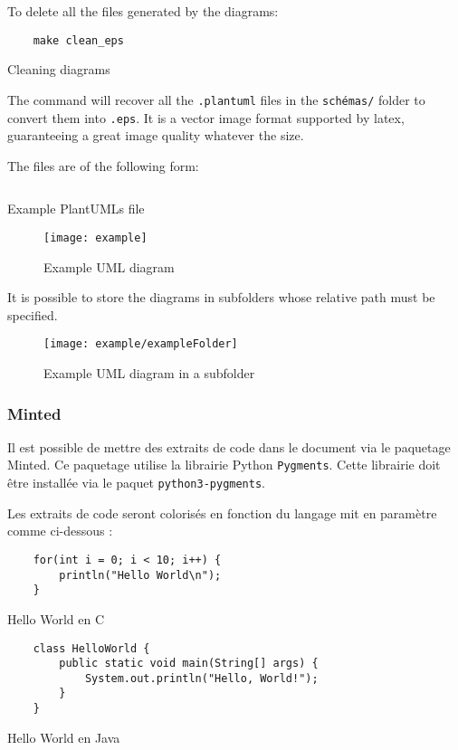 To delete all the files generated by the diagrams:
\begin{code}
    \begin{verbatim}
    make clean_eps
\end{verbatim}
    \caption{Cleaning diagrams}
\end{code}

The command will recover all the \verb=.plantuml= files
in the \verb=schémas/= folder to convert them into \verb=.eps=.
It is a vector image format supported by \gls{latex},
guaranteeing a great image quality whatever the size.

The files are of the following form:
\begin{code}
    \inputminted{vim}{../schemas/example.plantuml}
    \caption{Example PlantUMLs file}
\end{code}

\begin{figure}[H]
    \centering
    \texttt{[image: example]}
    \caption{Example UML diagram}
\end{figure}

It is possible to store the diagrams in subfolders whose relative path must be specified.
\begin{figure}[H]
    \centering
    \texttt{[image: example/exampleFolder]}
    \caption{Example UML diagram in a subfolder}
\end{figure}

\subsubsection{Minted}
Il est possible de mettre des extraits de code dans le document via le paquetage Minted.
Ce paquetage utilise la librairie Python \verb=Pygments=.
Cette librairie doit être installée via le paquet \verb=python3-pygments=.

Les extraits de code seront colorisés en fonction du langage mit en paramètre comme ci-dessous :

\begin{code}
    \begin{verbatim}
    for(int i = 0; i < 10; i++) {
        println("Hello World\n");
    }
\end{verbatim}
    \caption{Hello World en C}
\end{code}

\begin{code}
    \begin{verbatim}
    class HelloWorld {
        public static void main(String[] args) {
            System.out.println("Hello, World!");
        }
    }
\end{verbatim}
    \caption{Hello World en Java}
\end{code}

